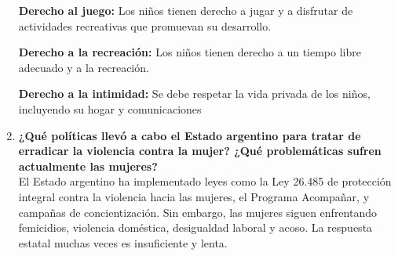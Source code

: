 \documentclass[a4paper,11pt]{article}
\begin{document}
\begin{enumerate}
    \textbf{Derecho al juego:}
    Los niños tienen derecho a jugar y a disfrutar de actividades recreativas que promuevan su desarrollo. 
    
    \textbf{Derecho a la recreación:}
    Los niños tienen derecho a un tiempo libre adecuado y a la recreación. 
    
    \textbf{Derecho a la intimidad:}
    Se debe respetar la vida privada de los niños, incluyendo su hogar y comunicaciones

    \item \textbf{¿Qué políticas llevó a cabo el Estado argentino para tratar de erradicar la violencia contra la mujer? ¿Qué problemáticas sufren actualmente las mujeres?} \\
    El Estado argentino ha implementado leyes como la Ley 26.485 de protección integral contra la violencia hacia las mujeres, el Programa Acompañar, y campañas de concientización. Sin embargo, las mujeres siguen enfrentando femicidios, violencia doméstica, desigualdad laboral y acoso. La respuesta estatal muchas veces es insuficiente y lenta.
\end{enumerate}
\end{document}
